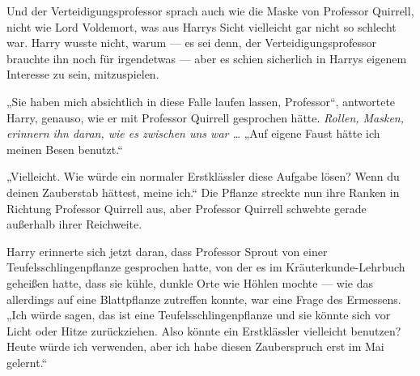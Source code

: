 Und der Verteidigungsprofessor sprach auch wie die Maske von Professor Quirrell, nicht wie Lord Voldemort, was aus Harrys Sicht vielleicht gar nicht so schlecht war. Harry wusste nicht, warum — es sei denn, der Verteidigungsprofessor brauchte ihn noch für irgendetwas — aber es schien sicherlich in Harrys eigenem Interesse zu sein, mitzuspielen.

„Sie haben mich absichtlich in diese Falle laufen lassen, Professor“, antwortete Harry, genauso, wie er mit Professor Quirrell gesprochen hätte.
\emph{Rollen, Masken, erinnern ihn daran, wie es zwischen uns war …}
„Auf eigene Faust hätte ich meinen Besen benutzt.“

„Vielleicht. Wie würde ein normaler Erstklässler diese Aufgabe lösen? Wenn du deinen Zauberstab hättest, meine ich.“
Die Pflanze streckte nun ihre Ranken in Richtung Professor Quirrell aus, aber Professor Quirrell schwebte gerade außerhalb ihrer Reichweite.

Harry erinnerte sich jetzt daran, dass Professor Sprout von einer Teufelsschlingenpflanze gesprochen hatte, von der es im Kräuterkunde-Lehrbuch geheißen hatte, dass sie kühle, dunkle Orte wie Höhlen mochte — wie das allerdings auf eine Blattpflanze zutreffen konnte, war eine Frage des Ermessens.
„Ich würde sagen, das ist eine Teufelsschlingenpflanze und sie könnte sich vor Licht oder Hitze zurückziehen. Also könnte ein Erstklässler vielleicht  benutzen? Heute würde ich  verwenden, aber ich habe diesen Zauberspruch erst im Mai gelernt.“

